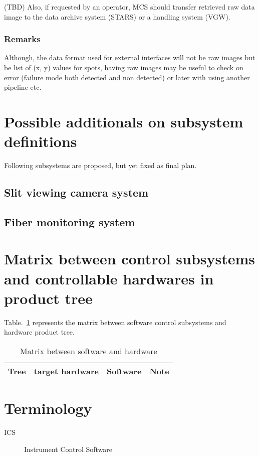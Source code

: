 \documentclass[a4paper,notitlepage]{article}
\begin{document}
(TBD) Also, if requested by an operator, 
MCS should transfer retrieved raw data image to the data archive system 
(STARS) or a handling system (VGW). 

\subsubsection{Remarks}
Although, the data format used for external interfaces will not be raw 
images but be list of (x, y) values for spots, having raw images may be useful 
to check on error (failure mode both detected and non detected) or later 
with using another pipeline etc. 


\section{Possible additionals on subsystem definitions}

Following subsystems are proposed, but yet fixed as final plan. 

\subsection{Slit viewing camera system}


\subsection{Fiber monitoring system}


\section{Matrix between control subsystems and controllable hardwares in product tree}

Table.~\ref{matrix-control-pt}
represents the matrix between software control subsystems and 
hardware product tree.

\begin{table}[htb]
\caption{Matrix between software and hardware}
\label{matrix-control-pt}
\begin{center}
\begin{tabular}{l|l||c||l}
Tree & target hardware & Software & Note \\
\hline
\end{tabular}
\end{center}
\end{table}







\section{Terminology}

\begin{description}
  \item[ICS] Instrument Control Software
\end{description}
\end{document}

